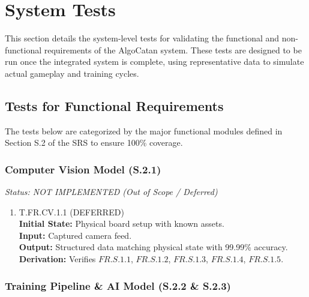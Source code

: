 \documentclass[12pt, titlepage]{article}
\begin{document}
\section{System Tests}

This section details the system-level tests for validating the functional and non-functional requirements of the AlgoCatan system. These tests are designed to be run once the integrated system is complete, using representative data to simulate actual gameplay and training cycles.

\subsection{Tests for Functional Requirements}

The tests below are categorized by the major functional modules defined in Section S.2 of the SRS to ensure 100\% coverage.

\subsubsection{Computer Vision Model (S.2.1)}
\textit{Status: NOT IMPLEMENTED (Out of Scope / Deferred)}

\begin{enumerate}
    \item{\hypertarget{T.FR.CV.1.1}{T.FR.CV.1.1} (DEFERRED)\\}
    \textbf{Initial State:} Physical board setup with known assets.\\
    \textbf{Input:} Captured camera feed.\\
    \textbf{Output:} Structured data matching physical state with 99.99\% accuracy.\\
    \textbf{Derivation:} Verifies $\hyperref[FR.S.1.1]{FR.S.1.1}$, $\hyperref[FR.S.1.2]{FR.S.1.2}$, $\hyperref[FR.S.1.3]{FR.S.1.3}$, $\hyperref[FR.S.1.4]{FR.S.1.4}$, $\hyperref[FR.S.1.5]{FR.S.1.5}$.
\end{enumerate}

\subsubsection{Training Pipeline \& AI Model (S.2.2 \& S.2.3)}
\end{document}
